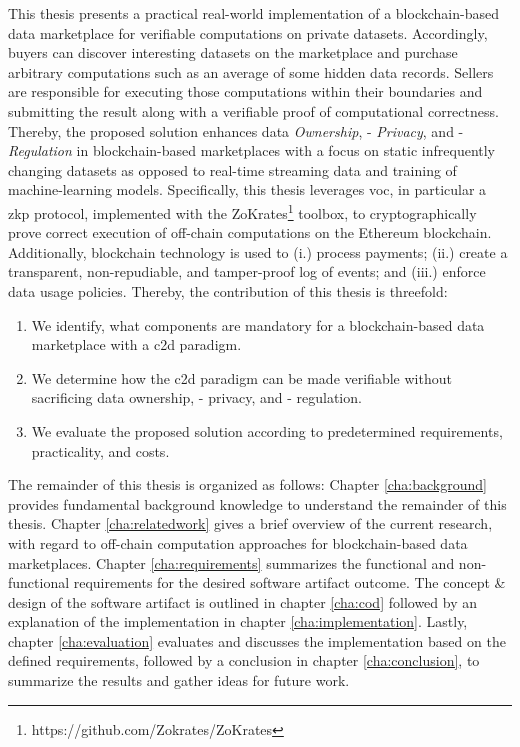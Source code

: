 This thesis presents a practical real-world implementation of a blockchain-based data marketplace for verifiable computations on private datasets. Accordingly, buyers can discover interesting datasets on the marketplace and purchase arbitrary computations such as an average of some hidden data records. Sellers are responsible for executing those computations within their boundaries and submitting the result along with a verifiable proof of computational correctness. Thereby, the proposed solution enhances data \emph{Ownership}, - \emph{Privacy}, and - \emph{Regulation} in blockchain-based marketplaces with a focus on static infrequently changing datasets as opposed to real-time streaming data and training of machine-learning models. Specifically, this thesis leverages \acrshort{voc}, in particular a \acrfull{zkp} protocol, implemented with the ZoKrates\footnote{https://github.com/Zokrates/ZoKrates} toolbox, to cryptographically prove correct execution of off-chain computations on the Ethereum blockchain. Additionally, blockchain technology is used to (i.) process payments; (ii.) create a transparent, non-repudiable, and tamper-proof log of events; and (iii.) enforce data usage policies. Thereby, the contribution of this thesis is threefold:

\begin{enumerate}
    \item We identify, what components are mandatory for a blockchain-based data marketplace with a \acrlong{c2d} paradigm.
    \item We determine how the \acrlong{c2d} paradigm can be made verifiable without sacrificing data ownership, - privacy, and - regulation.
    \item We evaluate the proposed solution according to predetermined requirements, practicality, and costs.
\end{enumerate}

The remainder of this thesis is organized as follows: Chapter \ref{cha:background} provides fundamental background knowledge to understand the remainder of this thesis. Chapter \ref{cha:relatedwork} gives a brief overview of the current research, with regard to off-chain computation approaches for blockchain-based data marketplaces. Chapter \ref{cha:requirements} summarizes the functional and non-functional requirements for the desired software artifact outcome. The concept \& design of the software artifact is outlined in chapter \ref{cha:cod} followed by an explanation of the implementation in chapter \ref{cha:implementation}. Lastly, chapter \ref{cha:evaluation} evaluates and discusses the implementation based on the defined requirements, followed by a conclusion in chapter \ref{cha:conclusion}, to summarize the results and gather ideas for future work.

